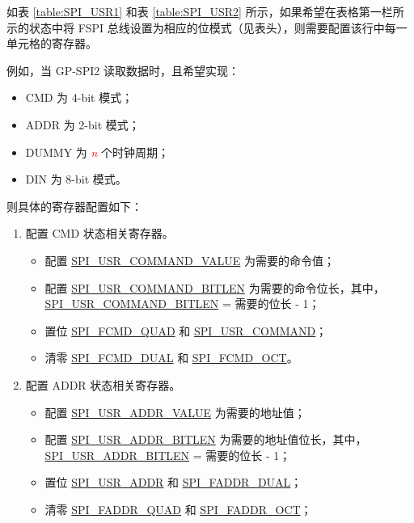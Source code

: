 \documentclass[main\_\_CN.tex]{subfiles}
\begin{document}
如表  \ref{table:SPI_USR1} 和表  \ref{table:SPI_USR2} 所示，如果希望在表格第一栏所示的状态中将 FSPI 总线设置为相应的位模式（见表头），则需要配置该行中每一单元格的寄存器。

例如，当 GP-SPI2 读取数据时，且希望实现：
\begin{itemize}
    \item CMD 为 4-bit 模式；
    \item ADDR 为 2-bit 模式；
    \item DUMMY 为 \textcolor{red}{\it{n}} 个时钟周期；
    \item DIN 为 8-bit 模式。
\end{itemize}
则具体的寄存器配置如下：

\begin{enumerate}
    \item 配置 CMD 状态相关寄存器。
        \begin{itemize}
            \item 配置 \hyperref[fielddesc:SPIUSRCOMMANDVALUE]{SPI\_USR\_COMMAND\_VALUE} 为需要的命令值；
            \item 配置 \hyperref[fielddesc:SPIUSRCOMMANDBITLEN]{SPI\_USR\_COMMAND\_BITLEN} 为需要的命令位长，其中，\hyperref[fielddesc:SPIUSRCOMMANDBITLEN]{SPI\_USR\_COMMAND\_BITLEN} = 需要的位长 - 1；
            \item 置位 \hyperref[fielddesc:SPIFCMDQUAD]{SPI\_FCMD\_QUAD} 和 \hyperref[fielddesc:SPIUSRCOMMAND]{SPI\_USR\_COMMAND}；
            \item 清零 \hyperref[fielddesc:SPIFCMDDUAL]{SPI\_FCMD\_DUAL} 和 \hyperref[fielddesc:SPIFCMDOCT]{SPI\_FCMD\_OCT}。
        \end{itemize}

    \item 配置 ADDR 状态相关寄存器。
        \begin{itemize}
            \item 配置 \hyperref[fielddesc:SPIUSRADDRVALUE]{SPI\_USR\_ADDR\_VALUE} 为需要的地址值；
            \item 配置 \hyperref[fielddesc:SPIUSRADDRBITLEN]{SPI\_USR\_ADDR\_BITLEN} 为需要的地址值位长，其中，\hyperref[fielddesc:SPIUSRADDRBITLEN]{SPI\_USR\_ADDR\_BITLEN} = 需要的位长 - 1；
            \item 置位 \hyperref[fielddesc:SPIUSRADDR]{SPI\_USR\_ADDR} 和 \hyperref[fielddesc:SPIFADDRDUAL]{SPI\_FADDR\_DUAL}；
            \item 清零 \hyperref[fielddesc:SPIFADDRQUAD]{SPI\_FADDR\_QUAD} 和 \hyperref[fielddesc:SPIFADDROCT]{SPI\_FADDR\_OCT}；
        \end{itemize}


\end{enumerate}
\end{document}
